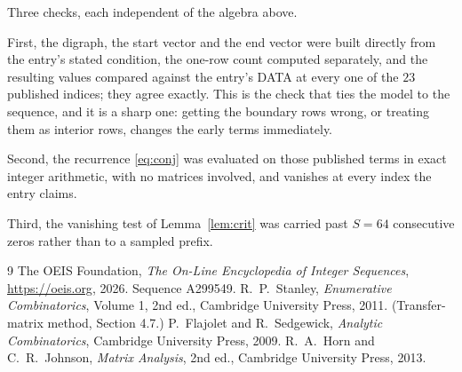 \documentclass[11pt,a4paper]{article}
\theoremstyle{plain}
\theoremstyle{definition}
\begin{document}
Three checks, each independent of the algebra above.

First, the digraph, the start vector and the end vector were built directly from the
entry's stated condition, the one-row count computed separately, and the resulting values
compared against the entry's DATA at every one of the $23$ published indices; they
agree exactly. This is the check that ties the model to the sequence, and it is a sharp one:
getting the boundary rows wrong, or treating them as interior rows, changes the early terms
immediately.

Second, the recurrence \eqref{eq:conj} was evaluated on those published terms in exact
integer arithmetic, with no matrices involved, and vanishes at every index the entry claims.

Third, the vanishing test of Lemma~\ref{lem:crit} was carried past $S=64$ consecutive
zeros rather than to a sampled prefix.

\begin{thebibliography}{9}
 The OEIS Foundation, \emph{The On-Line Encyclopedia of Integer
Sequences}, \url{https://oeis.org}, 2026. Sequence A299549.
 R.~P.~Stanley, \emph{Enumerative Combinatorics}, Volume 1, 2nd ed.,
Cambridge University Press, 2011. (Transfer-matrix method, Section 4.7.)
 P.~Flajolet and R.~Sedgewick, \emph{Analytic Combinatorics}, Cambridge
University Press, 2009.
 R.~A.~Horn and C.~R.~Johnson, \emph{Matrix Analysis}, 2nd ed., Cambridge
University Press, 2013.
\end{thebibliography}
\end{document}
